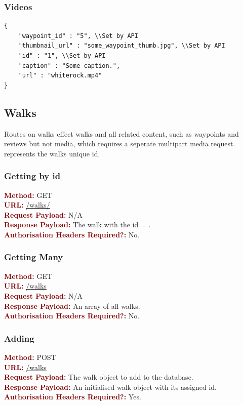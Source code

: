 \documentclass[11pt,a4paper]{report}
\begin{document}
\subsubsection{Videos}

\begin{lstlisting}[captionpos=b, caption=An example JSON Waypoint Object., label=lst:walk]
{
    "waypoint_id" : "5", \\Set by API
    "thumbnail_url" : "some_waypoint_thumb.jpg", \\Set by API
    "id" : "1", \\Set by API
    "caption" : "Some caption.",
    "url" : "whiterock.mp4"
}
\end{lstlisting}

\subsection{Walks}

Routes on walks effect walks and all related content, such as waypoints and reviews but not media, which requires a seperate multipart media request.  represents the walks unique id.

\subsubsection{Getting by id}
\textbf{\textcolor{Maroon}{Method:}} GET\\
\textbf{\textcolor{Maroon}{URL:}} \url{/walks/}\\
\textbf{\textcolor{Maroon}{Request Payload:}} N/A\\
\textbf{\textcolor{Maroon}{Response Payload:}} The walk with the id = .\\
\textbf{\textcolor{Maroon}{Authorisation Headers Required?:}} No.

\subsubsection{Getting Many}
\textbf{\textcolor{Maroon}{Method:}} GET\\
\textbf{\textcolor{Maroon}{URL:}} \url{/walks}\\
\textbf{\textcolor{Maroon}{Request Payload:}} N/A\\
\textbf{\textcolor{Maroon}{Response Payload:}} An array of all walks.\\
\textbf{\textcolor{Maroon}{Authorisation Headers Required?:}} No.

\subsubsection{Adding}
\textbf{\textcolor{Maroon}{Method:}} POST\\
\textbf{\textcolor{Maroon}{URL:}} \url{/walks}\\
\textbf{\textcolor{Maroon}{Request Payload:}} The walk object to add to the database.\\
\textbf{\textcolor{Maroon}{Response Payload:}} An initialised walk object with its assigned id.\\
\textbf{\textcolor{Maroon}{Authorisation Headers Required?:}} Yes.
\end{document}

